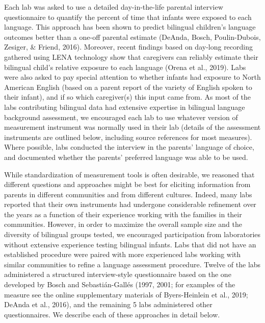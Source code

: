 \documentclass[,man,floatsintext]{apa6}
\begin{document}
Each lab was asked to use a detailed day-in-the-life parental interview questionnaire to quantify the percent of time that infants were exposed to each language. This approach has been shown to predict bilingual children's language outcomes better than a one-off parental estimate (DeAnda, Bosch, Poulin-Dubois, Zesiger, \& Friend, 2016). Moreover, recent findings based on day-long recording gathered using LENA technology show that caregivers can reliably estimate their bilingual child's relative exposure to each language (Orena et al., 2019). Labs were also asked to pay special attention to whether infants had exposure to North American English (based on a parent report of the variety of English spoken to their infant), and if so which caregiver(s) this input came from. As most of the labs contributing bilingual data had extensive expertise in bilingual language background assessment, we encouraged each lab to use whatever version of measurement instrument was normally used in their lab (details of the assessment instruments are outlined below, including source references for most measures). Where possible, labs conducted the interview in the parents' language of choice, and documented whether the parents' preferred language was able to be used.

While standardization of measurement tools is often desirable, we reasoned that different questions and approaches might be best for eliciting information from parents in different communities and from different cultures. Indeed, many labs reported that their own instruments had undergone considerable refinement over the years as a function of their experience working with the families in their communities. However, in order to maximize the overall sample size and the diversity of bilingual groups tested, we encouraged participation from laboratories without extensive experience testing bilingual infants. Labs that did not have an established procedure were paired with more experienced labs working with similar communities to refine a language assessment procedure. Twelve of the labs administered a structured interview-style questionnaire based on the one developed by Bosch and Sebastián-Gallés (1997, 2001; for examples of the measure see the online supplementary materials of Byers-Heinlein et al., 2019; DeAnda et al., 2016), and the remaining 5 labs administered other questionnaires. We describe each of these approaches in detail below.
\end{document}

